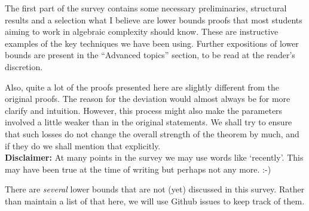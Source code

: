 The first part of the survey contains some necessary preliminaries, structural results and a selection what I believe are lower bounds proofs that most students aiming to work in algebraic complexity should know. 
These are instructive examples of the key techniques we have been using. 
Further expositions of lower bounds are present in the ``Advanced topics'' section, to be read at the reader's discretion. 

Also, quite a lot of the proofs presented here are slightly different from the original proofs. 
The reason for the deviation would almost always be for more clarify and intuition. 
However, this process might also make the parameters involved a little weaker than in the original statements. 
We shall try to ensure that such losses do not change the overall strength of the theorem by much, and if they do we shall mention that explicitly. \\

{\bf Disclaimer:} At many points in the survey we may use words like `recently'. This may have been true at the time of writing but perhaps not any more. :-)


There are \emph{several} lower bounds that are not (yet) discussed in this survey. Rather than maintain a list of that here, we will use Github issues to keep track of them. 
